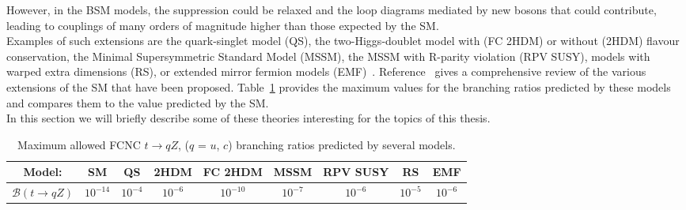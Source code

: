 \noindent However, in the BSM models, the suppression could be relaxed and the loop diagrams mediated by new bosons that could contribute, 
leading to couplings of many orders of magnitude higher than those expected by the SM.\\
Examples of such extensions are the quark-singlet model (QS)\cite{qs_limit}, the two-Higgs-doublet model with (FC 2HDM) or without (2HDM) flavour conservation\cite{h2dm_limit},
the Minimal Supersymmetric Standard Model (MSSM)\cite{mssm_limit}, the MSSM with R-parity violation (RPV SUSY)\cite{RPV_limit}, models with warped extra dimensions (RS)\cite{extra_limit}, or extended mirror fermion models (EMF)~\cite{rs_limit}.
Reference~\cite{report_limit} gives a comprehensive review of the various extensions of the SM that have been proposed.
Table~\ref{tab:expBR} provides the maximum values for the branching ratios  predicted by these models and compares them to the value predicted by the SM.\\
In this section we will briefly describe some of these theories interesting for the topics of this thesis.
\begin{table}[h]
	\begin{adjustbox}{max width=1.\textwidth,center}
		\begin{tabular}{ccccccccc}
			\hline 
			Model:&  			                         SM&  				   QS&  			   2HDM&  				FC 2HDM				& MSSM 			&  RPV SUSY			&  			RS				& EMF \\ 
			\hline 
			$\mathcal{B}(t\rightarrow qZ)$ & $10^{-14}$     & $10^{-4}$ &  $10^{-6}$          & $10^{-10}$  & $10^{-7}$      &$10^{-6}$            & $10^{-5}$           & $10^{-6}$  \\ 
			\hline 
		\end{tabular} 
	\end{adjustbox}
\caption{Maximum allowed FCNC $t\rightarrow qZ$, ($q$ = $u$, $c$) branching ratios predicted by several models\cite{tcZ_sm,qs_limit,h2dm_limit,mssm_limit,RPV_limit,extra_limit,rs_limit,report_limit}.}
\label{tab:expBR}
\end{table} 

